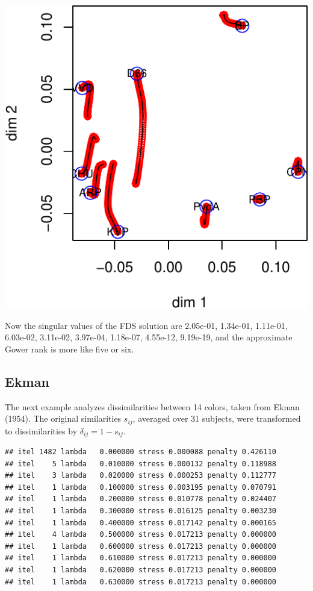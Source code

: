 \documentclass[
  12pt,
]{article}
\begin{document}
\begin{center}\includegraphics{penalty_files/figure-latex/poldist3-1} \end{center}

Now the singular values of the FDS solution are 2.05e-01, 1.34e-01,
1.11e-01, 6.03e-02, 3.11e-02, 3.97e-04, 1.18e-07, 4.55e-12, 9.19e-19,
and the approximate Gower rank is more like five or six.

\subsection{Ekman}\label{ekman}

The next example analyzes dissimilarities between 14 colors, taken from
Ekman (1954). The original similarities \(s_{ij}\), averaged over 31
subjects, were transformed to dissimilarities by
\(\delta_{ij}=1-s_{ij}\).

\begin{verbatim}
## itel 1482 lambda   0.000000 stress 0.000088 penalty 0.426110 
## itel    5 lambda   0.010000 stress 0.000132 penalty 0.118988 
## itel    3 lambda   0.020000 stress 0.000253 penalty 0.112777 
## itel    1 lambda   0.100000 stress 0.003195 penalty 0.070791 
## itel    1 lambda   0.200000 stress 0.010778 penalty 0.024407 
## itel    1 lambda   0.300000 stress 0.016125 penalty 0.003230 
## itel    1 lambda   0.400000 stress 0.017142 penalty 0.000165 
## itel    4 lambda   0.500000 stress 0.017213 penalty 0.000000 
## itel    1 lambda   0.600000 stress 0.017213 penalty 0.000000 
## itel    1 lambda   0.610000 stress 0.017213 penalty 0.000000 
## itel    1 lambda   0.620000 stress 0.017213 penalty 0.000000 
## itel    1 lambda   0.630000 stress 0.017213 penalty 0.000000
\end{verbatim}
\end{document}
